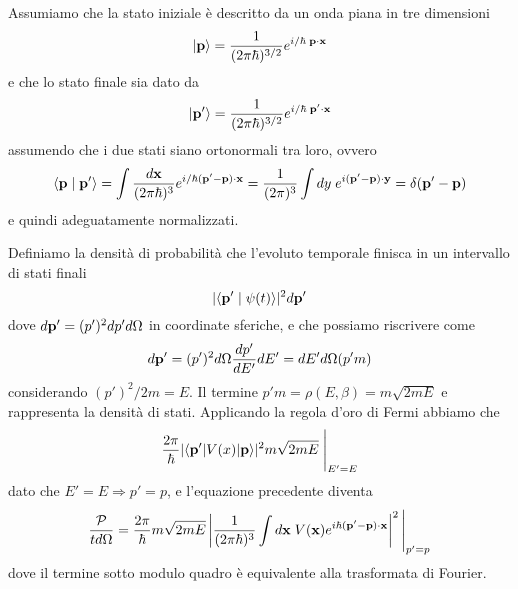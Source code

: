  Assumiamo che la stato iniziale \`e descritto da un onda piana in tre dimensioni
 \begin{equation*}
 	|\bold{p} \rangle = \frac{1}{(2\pi \hbar)^{3/2}}e^{i/\hbar \;\bold{p} \cdot \bold{x}}
 \end{equation*}
 e che lo stato finale sia dato da 
 \begin{equation*}
 	|\bold{p}'\rangle = \frac{1}{(2\pi \hbar)^{3/2}}e^{i/\hbar \;\bold{p}' \cdot \bold{x}}
 \end{equation*}
 assumendo che i due stati siano ortonormali tra loro, ovvero
 \begin{equation*}
 	\langle \bold{p} \mid \bold{p}' \rangle = \int \frac{d \bold{x}}{(2\pi \hbar)^3} e^{i/\hbar(\bold{p}'- \bold{p}) \cdot \bold{x}} = \frac{1}{(2\pi)^3} \int dy \; e^{i(\bold{p}'-\bold{p})\cdot \bold{y}} = \delta(\bold{p}'-\bold{p})
 \end{equation*}
 e quindi adeguatamente normalizzati.
 
 Definiamo la densit\`a di probabilit\`a che l'evoluto temporale finisca in un intervallo di stati finali
 \begin{equation*}
 	|\langle \bold{p}' \mid \psi(t) \rangle |^2 d \bold{p}'
 \end{equation*}
 dove $d \bold{p}' = (p')^2dp'd\Omega$ in coordinate sferiche, e che possiamo riscrivere come 
 \begin{equation*}
 	d\bold{p}' = (p')^2d\Omega \frac{dp'}{dE'}dE' = dE'd\Omega(p'm) 
 \end{equation*}
 considerando $(p')^2/2m = E$. Il termine $p'm = \rho(E,\beta) = m \sqrt{2mE}$ e rappresenta la densit\`a di stati.
 Applicando la regola d'oro di Fermi abbiamo che 
 \begin{equation*}
 	\frac{2 \pi}{\hbar}|\langle \bold{p}'|V(x)|\bold{p} \rangle|^2 m\sqrt{2mE} \;\Bigg |_{E' =E}
 \end{equation*}
 dato che $E'=E \Rightarrow p' = p$, e l'equazione precedente diventa 
 \begin{equation}
 	\frac{\mathcal{P}}{t d\Omega} = \frac{2\pi}{\hbar} m \sqrt{2mE} \left| \frac{1}{(2 \pi \hbar)^3}\int d\bold{x} \; V(\bold{x})e^{i\hbar (\bold{p}'-\bold{p}) \cdot \bold{x}}\right|^2 \Bigg |_{p'=p}
 \end{equation}
 dove il termine sotto modulo quadro \`e equivalente alla trasformata di Fourier.
 
